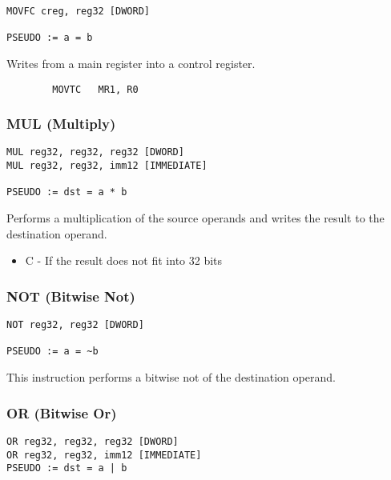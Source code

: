 \begin{verbatim}
MOVFC creg, reg32 [DWORD]

PSEUDO := a = b
\end{verbatim}


Writes from a main register into a control register.


\begin{verbatim}
        MOVTC   MR1, R0
\end{verbatim}

\subsubsection{MUL (Multiply)}

\begin{verbatim}
MUL reg32, reg32, reg32 [DWORD]
MUL reg32, reg32, imm12 [IMMEDIATE]

PSEUDO := dst = a * b
\end{verbatim}


Performs a multiplication of the source operands and writes the result to the destination operand.


\begin{itemize}
        \item   C - If the result does not fit into 32 bits
\end{itemize}

\subsubsection{NOT (Bitwise Not)}

\begin{verbatim}
NOT reg32, reg32 [DWORD]

PSEUDO := a = ~b
\end{verbatim}


This instruction performs a bitwise not of the destination operand.

\subsubsection{OR (Bitwise Or)}

\begin{verbatim}
OR reg32, reg32, reg32 [DWORD]
OR reg32, reg32, imm12 [IMMEDIATE]
PSEUDO := dst = a | b
\end{verbatim}

